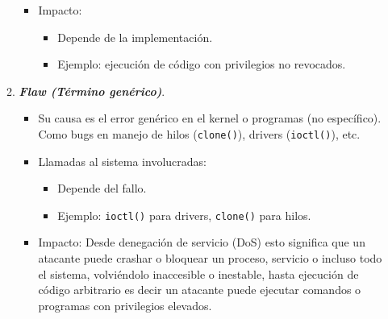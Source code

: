 \documentclass[12pt,letterpaper]{article}
\begin{document}
\begin{enumerate}
\begin{enumerate}[label=\arabic*)]
\begin{itemize}
    \item Impacto:
      \begin{itemize}
      \item Depende de la implementación.
      \item Ejemplo: ejecución de código con privilegios no revocados.
      \end{itemize}
    \end{itemize}
    
  \item \textbf{\textit{Flaw (Término genérico)}}.
    \begin{itemize}
    \item Su causa es el error genérico en el kernel o programas (no específico). Como bugs en manejo de hilos (\texttt{clone()}), drivers (\texttt{ioctl()}), etc.
      
    \item Llamadas al sistema involucradas:
      \begin{itemize}
      \item Depende del fallo.
      \item Ejemplo: \texttt{ioctl()} para drivers, \texttt{clone()} para hilos.
      \end{itemize}
      
    \item Impacto:
      Desde denegación de servicio (DoS) esto significa que un atacante puede crashar o bloquear un proceso, servicio o incluso todo el sistema, volviéndolo inaccesible o inestable,  hasta ejecución de código arbitrario es decir un atacante puede ejecutar comandos o programas con privilegios elevados.
    \end{itemize}
  \end{enumerate}
\end{enumerate}
\end{document}
